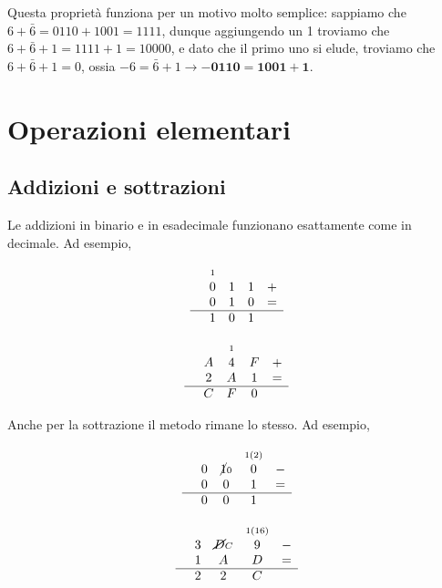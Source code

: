 \documentclass[11pt, a4paper, titlepage, oneside]{scrbook}
\begin{document}
Questa proprietà funziona per un motivo molto semplice: sappiamo che $6 + \bar{6} = 0110 + 1001 = 1111$, dunque aggiungendo un 1 troviamo che $6 + \bar{6} + 1 = 1111 + 1 = 10000$, e dato che il primo uno si elude, troviamo che $6 + \bar{6} + 1 = 0$, ossia $-6 = \bar{6} + 1 \longrightarrow \bm{-0110 = 1001 + 1}$.  

\section{Operazioni elementari}

\subsection{Addizioni e sottrazioni}

Le addizioni in binario e in esadecimale funzionano esattamente come in decimale. Ad esempio,

\noindent
\begin{minipage}{0.48\textwidth}
\[
\begin{array}{rcccc}
& \scriptstyle 1 & & & \\
& 0 & 1 & 1 & + \\
& 0 & 1 & 0 & = \\
\hline
& 1 & 0 & 1 &
\end{array}
\]
\end{minipage}\hfill
\begin{minipage}{0.48\textwidth}
\[
\begin{array}{rcccc}
& & \scriptstyle 1 & & \\
& A & 4 & F & + \\
& 2 & A & 1 & = \\
\hline
& C & F & 0 &
\end{array}
\]
\end{minipage}

Anche per la sottrazione il metodo rimane lo stesso. Ad esempio,

\noindent
\begin{minipage}{0.48\textwidth}
\[
\begin{array}{rcccc}
& & & \scriptstyle 1 (2) & \\
& 0 & \cancel{1} \scriptstyle 0 & 0 & - \\
& 0 & 0 & 1 & = \\
\hline
& 0 & 0 & 1 &
\end{array}
\]
\end{minipage}\hfill
\begin{minipage}{0.48\textwidth}
\[
\begin{array}{rcccc}
& & & \scriptstyle 1 (16) & \\
& 3 & \cancel{D} \scriptstyle C & 9 & - \\
& 1 & A & D & = \\
\hline
& 2 & 2 & C &
\end{array}
\]
\end{minipage}
\end{document}
